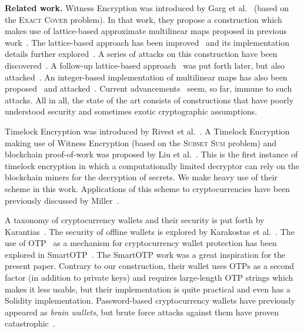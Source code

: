 \noindent
\textbf{Related work.}
Witness Encryption was introduced by Garg et al.~\cite{STOC:GGSW13} (based on the \textsc{Exact
Cover} problem). In that
work, they propose a construction which makes use of lattice-based approximate multilinear
maps proposed in previous work~\cite{EC:GarGenHal13}. The lattice-based approach has been
improved~\cite{EC:LanSteSte14} and its implementation details further explored~\cite{AC:ACLL15}.
A series of attacks on this construction have been discovered~\cite{EC:CHLRS15,EC:HuJia16,PKC:CLLT17,C:CGHLMM15,C:AlbBaiDuc16,EPRINT:CheJeoLee16}.
A follow-up lattice-based approach~\cite{TCC:GenGorHal15} was put forth later, but also attacked~\cite{C:CLLT16}.
An integer-based implementation of multilinear maps has also been proposed~\cite{C:CorLepTib13,C:CorLepTib15} and
attacked~\cite{EC:CHLRS15,EPRINT:MinFou15,EPRINT:CheLeeRyu15}.
Current advancements~\cite{ma2018mmap} seem, so far, immune to such attacks.
All in all, the state of the art consists of constructions that have poorly
understood security and sometimes exotic cryptographic assumptions.

Timelock Encryption was introduced by Rivest et al.~\cite{timelock}. A Timelock Encryption
making use of Witness Encryption (based on the \textsc{Subset Sum} problem) and blockchain proof-of-work was proposed by Liu et
al.~\cite{timelock-bitcoin}. This is the first instance of timelock encryption in which
a computationally limited decryptor can rely on the blockchain miners for the decryption
of secrets. We make heavy use of their scheme in this work. Applications of this scheme to cryptocurrencies
have been previously discussed by Miller~\cite{miller-timelock}.

A taxonomy of cryptocurrency wallets and their security is put forth by Karantias~\cite{wallet-taxonomy}.
The security of offline wallets is explored by Karakostas et al.~\cite{hardware-wallets}.
The use of OTP~\cite{rfc6238,rfc4226} as a mechanism for cryptocurrency wallet protection has been explored in SmartOTP~\cite{smartotp}.
The SmartOTP work was a great inspiration for the present paper. Contrary to our construction, their
wallet uses OTPs as a second factor (in addition to private keys) and requires large-length OTP strings
which makes it less usable, but their implementation is quite practical and even has a Solidity implementation.
Password-based cryptocurrency wallets have previously appeared as \emph{brain wallets},
but brute force attacks against them have proven catastrophic~\cite{brain-drain}.
